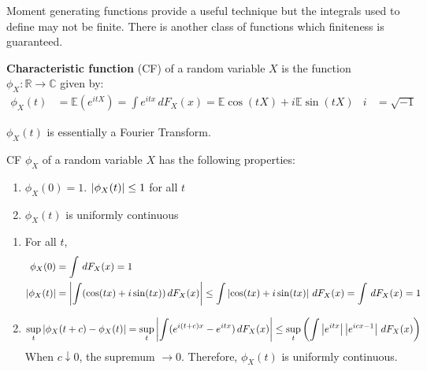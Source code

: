 \documentclass{huhtakm-template-book}
\newcommand{\expect}{\mathbb{E}}
\begin{document}
Moment generating functions provide a useful technique but the integrals used to define may not be finite. There is another class of functions which finiteness is guaranteed.
\begin{defn}
	\textbf{Characteristic function} (CF) of a random variable $X$ is the function $\phi_{X}:\mathbb{R}\to\mathbb{C}$ given by:
	\begin{align*}
		\phi_{X}(t)&=\expect(e^{itX})=\int e^{itx}\,dF_{X}(x)=\expect\cos(tX)+i\expect\sin(tX) & i&=\sqrt{-1}
	\end{align*}
\end{defn}
\begin{rem}
	$\phi_{X}(t)$ is essentially a Fourier Transform.
\end{rem}

\newpage
\begin{lem}
	CF $\phi_{X}$ of a random variable $X$ has the following properties:
	\begin{enumerate}
		\item $\phi_{X}(0)=1$. $\left|{\phi_{X}(t)}\right|\leq 1$ for all $t$
		\item $\phi_{X}(t)$ is uniformly continuous
	\end{enumerate}
\end{lem}
\begin{proofing}
	\begin{enumerate}
		\item For all $t$,
		\begin{align*}
			\phi_{X}(0)&=\int\,dF_{X}(x)=1\\
			\left|{\phi_{X}(t)}\right|&=\left|{\int(\cos(tx)+i\sin(tx))\,dF_{X}(x)}\right|\leq\int\left|{\cos(tx)+i\sin(tx)}\right|\,dF_{X}(x)=\int\,dF_{X}(x)=1
		\end{align*}
		\item
		\begin{equation*}
			\sup_{t}\left|{\phi_{X}(t+c)-\phi_{X}(t)}\right|=\sup_{t}\left|{\int(e^{i(t+c)x}-e^{itx})\,dF_{X}(x)}\right|\leq\sup_{t}\left(\int\left|{e^{itx}}\right|\left|{e^{icx-1}}\right|\,dF_{X}(x)\right)
		\end{equation*}
		When $c\downarrow 0$, the supremum $\to 0$. Therefore, $\phi_{X}(t)$ is uniformly continuous.
	\end{enumerate}
\end{proofing}
\end{document}
